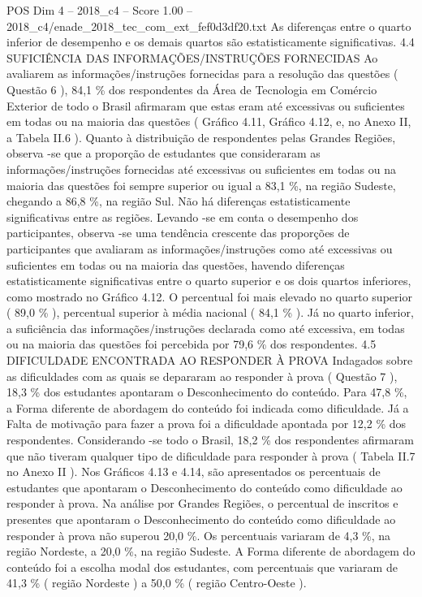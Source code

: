\begin{textsample}{POS Dim 4 – 2018\_c4 – Score 1.00 – 2018\_c4/enade\_2018\_tec\_com\_ext\_fef0d3df20.txt}
As diferenças entre o quarto inferior de desempenho e os demais quartos são estatisticamente significativas. 4.4 SUFICIÊNCIA DAS INFORMAÇÕES/INSTRUÇÕES FORNECIDAS Ao avaliarem as informações/instruções fornecidas para a resolução das questões ( Questão 6 ), 84,1 \% dos respondentes da Área de Tecnologia em Comércio Exterior de todo o Brasil afirmaram que estas eram até excessivas ou suficientes em todas ou na maioria das questões ( Gráfico 4.11, Gráfico 4.12, e, no Anexo II, a Tabela II.6 ).
Quanto à distribuição de respondentes pelas Grandes Regiões, observa -se que a proporção de estudantes que consideraram as informações/instruções fornecidas até excessivas ou suficientes em todas ou na maioria das questões foi sempre superior ou igual a 83,1 \%, na região Sudeste, chegando a 86,8 \%, na região Sul.
Não há diferenças estatisticamente significativas entre as regiões.
Levando -se em conta o desempenho dos participantes, observa -se uma tendência crescente das proporções de participantes que avaliaram as informações/instruções como até excessivas ou suficientes em todas ou na maioria das questões, havendo diferenças estatisticamente significativas entre o quarto superior e os dois quartos inferiores, como mostrado no Gráfico 4.12.
O percentual foi mais elevado no quarto superior ( 89,0 \% ), percentual superior à média nacional ( 84,1 \% ).
Já no quarto inferior, a suficiência das informações/instruções declarada como até excessiva, em todas ou na maioria das questões foi percebida por 79,6 \% dos respondentes. 4.5 DIFICULDADE ENCONTRADA AO RESPONDER À PROVA Indagados sobre as dificuldades com as quais se depararam ao responder à prova ( Questão 7 ), 18,3 \% dos estudantes apontaram o Desconhecimento do conteúdo.
Para 47,8 \%, a Forma diferente de abordagem do conteúdo foi indicada como dificuldade.
Já a Falta de motivação para fazer a prova foi a dificuldade apontada por 12,2 \% dos respondentes.
Considerando -se todo o Brasil, 18,2 \% dos respondentes afirmaram que não tiveram qualquer tipo de dificuldade para responder à prova ( Tabela II.7 no Anexo II ).
Nos Gráficos 4.13 e 4.14, são apresentados os percentuais de estudantes que apontaram o Desconhecimento do conteúdo como dificuldade ao responder à prova.
Na análise por Grandes Regiões, o percentual de inscritos e presentes que apontaram o Desconhecimento do conteúdo como dificuldade ao responder à prova não superou 20,0 \%.
Os percentuais variaram de 4,3 \%, na região Nordeste, a 20,0 \%, na região Sudeste.
A Forma diferente de abordagem do conteúdo foi a escolha modal dos estudantes, com percentuais que variaram de 41,3 \% ( região Nordeste ) a 50,0 \% ( região Centro-Oeste ).

\end{textsample}
